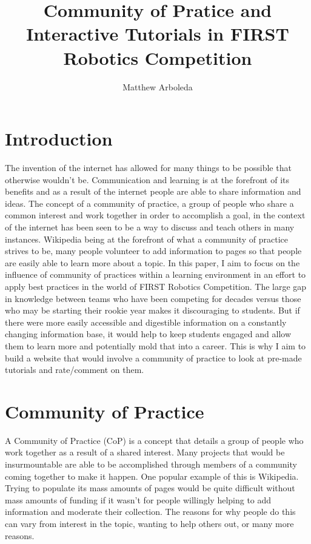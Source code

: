 \documentclass[10pt,twocolumn]{article}
\title{Community of Pratice and Interactive Tutorials in FIRST Robotics Competition}
\author{Matthew Arboleda}
\affiliation{Occidental College}
\begin{document}
\maketitle

\section{Introduction}
The invention of the internet has allowed for many things to be possible that otherwise wouldn't be. Communication and learning is at the forefront of its benefits and as a result of the internet people are able to share information and ideas. The concept of a community of practice, a group of people who share a common interest and work together in order to accomplish a goal, in the context of the internet has been seen to be a way to discuss and teach others in many instances. Wikipedia being at the forefront of what a community of practice strives to be, many people volunteer to add information to pages so that people are easily able to learn more about a topic. In this paper, I aim to focus on the influence of community of practices within a learning environment in an effort to apply best practices in the world of FIRST Robotics Competition. The large gap in knowledge between teams who have been competing for decades versus those who may be starting their rookie year makes it discouraging to students. But if there were more easily accessible and digestible information on a constantly changing information base, it would help to keep students engaged and allow them to learn more and potentially mold that into a career. This is why I aim to build a website that would involve a community of practice to look at pre-made tutorials and rate/comment on them. 


\section{Community of Practice}

A Community of Practice (CoP) is a concept that details a group of people who work together as a result of a shared interest. Many projects that would be insurmountable are able to be accomplished through members of a community coming together to make it happen. One popular example of this is Wikipedia. Trying to populate its mass amounts of pages would be quite difficult without mass amounts of funding if it wasn't for people willingly helping to add information and moderate their collection. The reasons for why people do this can vary from interest in the topic, wanting to help others out, or many more reasons. 
\end{document}
